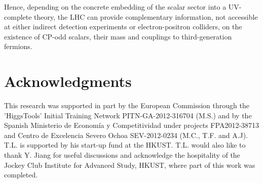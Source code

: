 \documentclass[preprintnumbers,superscriptaddress,nofootinbib,aps,prd,floatfix]{revtex4}
\begin{document}
Hence, depending on the concrete embedding of the scalar sector into a UV-complete theory, the LHC can provide complementary information, not accessible at either indirect detection experiments or electron-positron colliders, on the existence of CP-odd scalars, their mass and couplings to third-generation fermions.

\section{Acknowledgments}
This research was supported in part by the European Commission through the 'HiggsTools' Initial Training Network PITN-GA-2012-316704 (M.S.) and 
by the Spanish Ministerio de Econom\'ia y Competitividad  under projects FPA2012-38713 and Centro de Excelencia Severo Ochoa SEV-2012-0234 (M.C., T.F. and A.J). T.L. is supported by his start-up fund at the HKUST. T.L.  would also like to thank Y. Jiang for useful discussions and acknowledge the hospitality of the Jockey Club Institute for Advanced Study, HKUST, where part of this work was completed. 


\appendix
\label{app:amplitudes}
\end{document}
